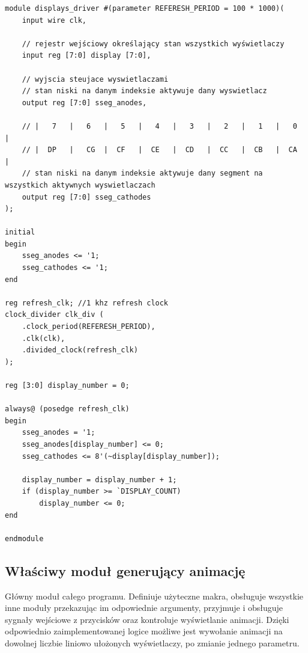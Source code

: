 \documentclass[a4paper]{article}
\begin{document}
\pagebreak
\begin{verbatim}
module displays_driver #(parameter REFERESH_PERIOD = 100 * 1000)(
    input wire clk,
    
    // rejestr wejściowy określający stan wszystkich wyświetlaczy
    input reg [7:0] display [7:0],
    
    // wyjscia steujace wyswietlaczami
    // stan niski na danym indeksie aktywuje dany wyswietlacz
    output reg [7:0] sseg_anodes,
    
    // |   7   |   6   |   5   |   4   |   3   |   2   |   1   |   0   |
    // |  DP   |   CG  |  CF   |  CE   |  CD   |  CC   |  CB   |  CA   |
    // stan niski na danym indeksie aktywuje dany segment na wszystkich aktywnych wyswietlaczach
    output reg [7:0] sseg_cathodes
);

initial 
begin
    sseg_anodes <= '1;
    sseg_cathodes <= '1;
end

reg refresh_clk; //1 khz refresh clock
clock_divider clk_div (
    .clock_period(REFERESH_PERIOD),
    .clk(clk),
    .divided_clock(refresh_clk)
);

reg [3:0] display_number = 0;

always@ (posedge refresh_clk)
begin 
    sseg_anodes = '1;
    sseg_anodes[display_number] <= 0;
    sseg_cathodes <= 8'(~display[display_number]);
    
    display_number = display_number + 1;
    if (display_number >= `DISPLAY_COUNT)
        display_number <= 0;
end

endmodule
\end{verbatim}

\subsection{Właściwy moduł generujący animację}
Główny moduł całego programu. Definiuje użyteczne makra, obsługuje wszystkie inne moduły
przekazując im odpowiednie argumenty,
przyjmuje i obsługuje sygnały wejściowe z przycisków oraz kontroluje
wyświetlanie animacji.
Dzięki odpowiednio zaimplementowanej logice możliwe jest wywołanie animacji na dowolnej liczbie liniowo ułożonych 
wyświetlaczy, po zmianie jednego parametru. 
\end{document}
